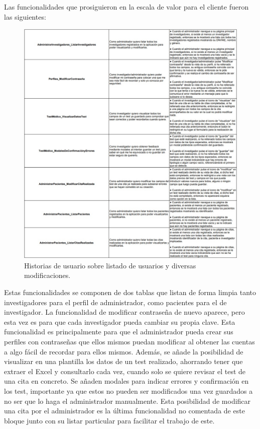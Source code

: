 Las funcionalidades que prosiguieron en la escala de valor para el cliente fueron las siguientes:
\newline

 \begin{figure}[h]
    \centering
     \includegraphics[width=1\textwidth]{images/historiasUsuario-3.jpg}
    \caption{Historias de usuario sobre listado de usuarios y diversas modificaciones.}
\end{figure}
\FloatBarrier


Estas funcionalidades se componen de dos tablas que listan de forma limpia tanto investigadores para el perfil de administrador, como pacientes para el de investigador. La funcionalidad de modificar contraseña de nuevo aparece, pero esta vez es para que cada investigador pueda cambiar su propia clave. Esta funcionalidad es principalmente para que el administrador pueda crear sus perfiles con contraseñas que ellos mismos puedan modificar al obtener las cuentas a algo fácil de recordar para ellos mismos. Además, se añade la posibilidad de visualizar en una plantilla los datos de un test realizado, ahorrando tener que extraer el Excel y consultarlo cada vez, cuando solo se quiere revisar el test de una cita en concreto. Se añaden modales para indicar errores y confirmación en los test, importante ya que estos no pueden ser modificados una vez guardados a no ser que lo haga el administrador manualmente. Esta posibilidad de modificar una cita por el administrador es la última funcionalidad no comentada de este bloque junto con su listar particular para facilitar el trabajo de este.
\newpage

